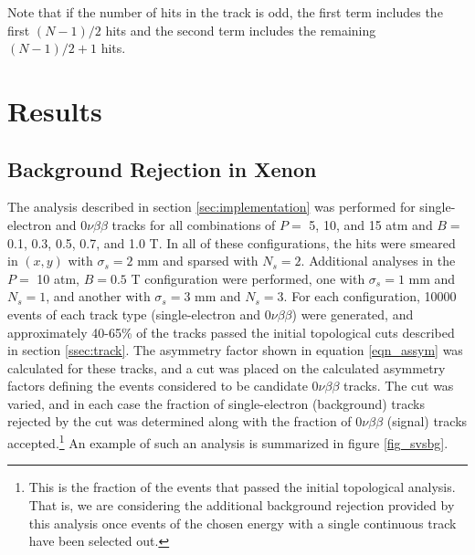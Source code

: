 \documentclass{JINST}
\begin{document}
\noindent Note that if the number of hits in the track is odd, the first term includes the first $(N-1)/2$ hits and
the second term includes the remaining $(N-1)/2 + 1$ hits.

\section{Results}
\subsection{Background Rejection in Xenon}
The analysis described in section \ref{sec:implementation} was performed for single-electron and
$0\nu\beta\beta$ tracks for all combinations of $P =$ 5, 10, and 15 atm and $B =$ 0.1, 0.3, 0.5, 0.7, 
and 1.0 T.  In all of these configurations, the hits were smeared in $(x,y)$ with $\sigma_{s} = 2$ mm and 
sparsed with $N_{s} = 2$.  Additional analyses in the $P =$ 10 atm, $B = 0.5$ T configuration were performed, 
one with $\sigma_{s} = 1$ mm and $N_{s} = 1$, and another with $\sigma_{s} = 3$ mm and $N_{s} = 3$.  For 
each configuration, 10000 events of each track type (single-electron and $0\nu\beta\beta$) were generated, 
and approximately 40-65\% of the tracks passed the initial topological cuts described in section 
\ref{ssec:track}.  The asymmetry factor shown in equation \ref{eqn_assym} was calculated for these tracks, and
a cut was placed on the calculated asymmetry factors defining the events considered to be candidate 
$0\nu\beta\beta$ tracks.  The cut was varied, and in each case 
the fraction of single-electron (background) tracks rejected by the cut was determined along with the fraction of 
$0\nu\beta\beta$ (signal) tracks accepted.\footnote{This is the fraction of the events that passed the initial 
topological analysis.  That is, we are considering the additional background rejection provided by this analysis  
once events of the chosen energy with a single continuous track have been selected out.}  An example of such 
an analysis is summarized in figure \ref{fig_svsbg}.
\end{document}
